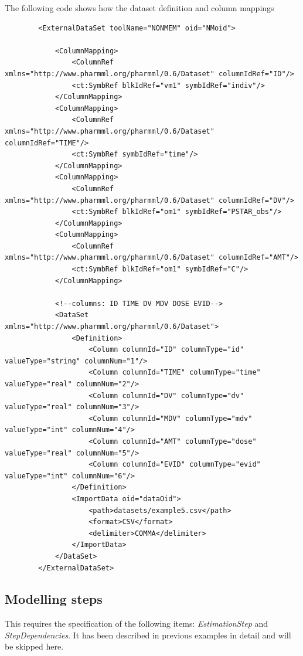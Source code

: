 The following code shows how the dataset definition and column mappings 
\lstset{language=XML}
\begin{lstlisting}
        <ExternalDataSet toolName="NONMEM" oid="NMoid">
            
            <ColumnMapping>
                <ColumnRef xmlns="http://www.pharmml.org/pharmml/0.6/Dataset" columnIdRef="ID"/>
                <ct:SymbRef blkIdRef="vm1" symbIdRef="indiv"/>
            </ColumnMapping>
            <ColumnMapping>
                <ColumnRef xmlns="http://www.pharmml.org/pharmml/0.6/Dataset" columnIdRef="TIME"/> 
                <ct:SymbRef symbIdRef="time"/>
            </ColumnMapping>
            <ColumnMapping>
                <ColumnRef xmlns="http://www.pharmml.org/pharmml/0.6/Dataset" columnIdRef="DV"/> 
                <ct:SymbRef blkIdRef="om1" symbIdRef="PSTAR_obs"/>
            </ColumnMapping>
            <ColumnMapping>
                <ColumnRef xmlns="http://www.pharmml.org/pharmml/0.6/Dataset" columnIdRef="AMT"/>
                <ct:SymbRef blkIdRef="om1" symbIdRef="C"/>
            </ColumnMapping>
            
            <!--columns: ID TIME DV MDV DOSE EVID-->
            <DataSet xmlns="http://www.pharmml.org/pharmml/0.6/Dataset">
                <Definition>
                    <Column columnId="ID" columnType="id" valueType="string" columnNum="1"/>
                    <Column columnId="TIME" columnType="time" valueType="real" columnNum="2"/>
                    <Column columnId="DV" columnType="dv" valueType="real" columnNum="3"/>
                    <Column columnId="MDV" columnType="mdv" valueType="int" columnNum="4"/>
                    <Column columnId="AMT" columnType="dose" valueType="real" columnNum="5"/>
                    <Column columnId="EVID" columnType="evid" valueType="int" columnNum="6"/>
                </Definition>
                <ImportData oid="dataOid">
                    <path>datasets/example5.csv</path>
                    <format>CSV</format>
                    <delimiter>COMMA</delimiter>
                </ImportData>
            </DataSet>
        </ExternalDataSet>
\end{lstlisting}


\subsection{Modelling steps}
This requires the specification of the following items: \textit{EstimationStep} and \textit{StepDependencies}.
It has been described in previous examples in detail and will be skipped here.




